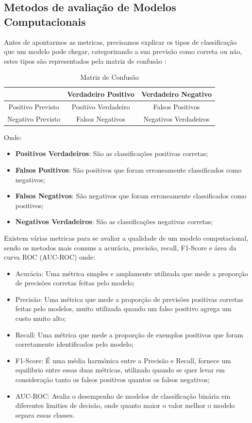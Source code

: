 \documentclass[
	12pt,				%
	openright,			%
	oneside,			%
	a4paper,			%
	english,			%
	brazil				%
	]{abntex2}
\begin{document}
\subsection{Metodos de avaliação de Modelos Computacionais}

Antes de apontarmos as metricas, precisamos explicar os tipos de classificação que um modelo pode chegar,
categorizando a sua previsão como correta ou não, estes tipos são representados pela matriz de confusão
\cite{acuracia_matriz}:

\begin{table}[H]
	\centering
	\caption{\label{Matriz de Confusão}Matriz de Confusão}
	\begin{tabular}{|c|c|c|}
	\hline
					  & Verdadeiro Positivo & Verdadeiro Negativo   \\ \hline
	Positivo Previsto & Positivo Verdadeiro & Falsos Positivos      \\ \hline
	Negativo Previsto & Falsos Negativos    & Negativos Verdadeiros \\ \hline
	\end{tabular}
\end{table}

Onde:
\begin{itemize}
	\item \textbf{Positivos Verdadeiros}: São as classificações positivas corretas;
	\item \textbf{Falsos Positivos}: São positivos que foram erroneamente classificados como negativos;
	\item \textbf{Falsos Negativos}: São negativos que foram erroneamente classificados como positivos;
	\item \textbf{Negativos Verdadeiros}: São as classificações negativas corretas;
\end{itemize}

Existem várias metricas para se avaliar a qualidade de um modelo computacional, sendo os metodos mais
comuns a acurácia, precisão, recall, F1-Score e área da curva ROC (AUC-ROC) \cite{metricas_aval_modelo} onde:

\begin{itemize}
	\item Acurácia: Uma métrica simples e amplamente utilizada que mede a proporção de precisões corretas feitas pelo modelo;
	\item Precisão: Uma métrica que mede a proporção de previsões positivas corretas feitas pelo modelos, muito utilizada 
	quando um falso positivo agrega um custo muito alto;
	\item Recall: Uma métrica que mede a proporção de exemplos positivos que foram corretamente identificados pelo modelo;
	\item F1-Score: É uma média harmônica entre a Precisão e Recall, fornece um equilibrio entre essas duas métricas, utilizado
	quando se quer levar em consideração tanto os falsos positivos quantos os falsos negativos;
	\item AUC-ROC: Avalia o desempenho de modelos de classificação binária em diferentes limities de decisão, onde quanto
	maior o valor melhor o modelo separa essas classes.
\end{itemize}
\end{document}
